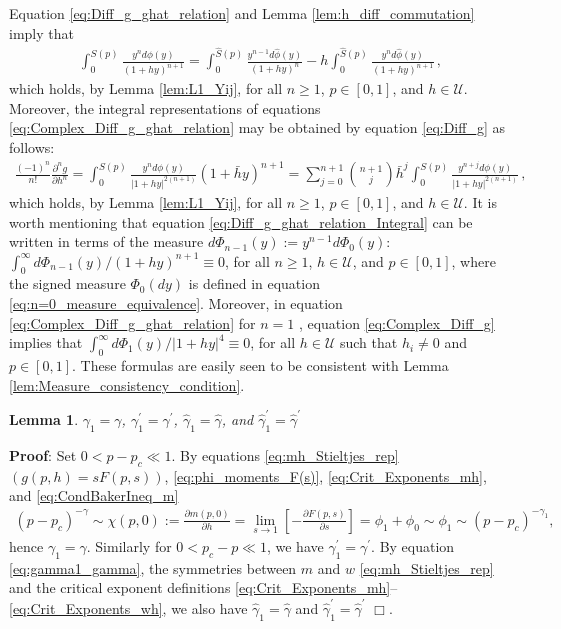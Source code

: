 \documentclass[english,12pt,jmp,graphicx]{revtex4-1}
\newtheorem{lemma}{Lemma}[section]
\newcommand{\ph}{\hat{\phi}}
\newcommand{\gh}{\hat{\gamma}}
\begin{document}
Equation \eqref{eq:Diff_g_ghat_relation} and Lemma
\ref{lem:h_diff_commutation} imply that    
%
\begin{align}\label{eq:Diff_g_ghat_relation_Integral}
  \int_0^{S(p)}\frac{y^nd\phi(y)}{(1+hy)^{n+1}}=\int_0^{\hat{S}(p)}\frac{y^{n-1}d\ph(y)}{(1+hy)^n} 
                                -h \int_0^{\hat{S}(p)}\frac{y^nd\ph(y)}{(1+hy)^{n+1}}
  \,,                              
\end{align}
%
which holds, by Lemma \ref{lem:L1_Yij}, for all $n\geq1$, $p\in[0,1]$, and
$h\in\mathcal{U}$. Moreover, the integral representations of equations
\eqref{eq:Complex_Diff_g_ghat_relation} may be obtained by equation
\eqref{eq:Diff_g} as follows:  
%
\begin{align}\label{eq:Complex_Diff_g}
  \frac{(-1)^n}{n!}\frac{\partial^ng}{\partial h^n}
   =\int_0^{S(p)}\frac{y^nd\phi(y)}{|1+hy|^{2(n+1)}}(1+\bar{h}y)^{n+1}
   =\sum_{j=0}^{n+1}{n+1 \choose j}\bar{h}^j
                 \int_0^{S(p)}\frac{y^{n+j}d\phi(y)}{|1+hy|^{2(n+1)}}\,,
\end{align}
%
which holds, by Lemma \ref{lem:L1_Yij}, for all $n\geq1$, $p\in[0,1]$, and
$h\in\mathcal{U}$. It is worth mentioning that equation
\eqref{eq:Diff_g_ghat_relation_Integral} can be written in terms of
the measure $d\Phi_{n-1}(y):=y^{n-1}d\Phi_0(y)$:
$\int_0^\infty d\Phi_{n-1}(y)/(1+hy)^{n+1}\equiv0$, for all $n\geq1$, $h\in\mathcal{U}$, and
$p\in[0,1]$, where the signed measure $\Phi_0(dy)$ is defined in equation 
\eqref{eq:n=0_measure_equivalence}. Moreover, in equation
\eqref{eq:Complex_Diff_g_ghat_relation} for $n=1$ , equation
\eqref{eq:Complex_Diff_g} implies that $\int_0^\infty d\Phi_1(y)/|1+hy|^4\equiv0$, for 
all $h\in\mathcal{U}$ such that $h_i\neq0$ and $p\in[0,1]$. These formulas
are easily seen to be consistent with Lemma
\ref{lem:Measure_consistency_condition}. 
%
\begin{lemma}\label{lem:nonzero_gamma1_etc}
  $\gamma_1=\gamma$, $\gamma_1^\prime=\gamma^\prime$, $\gh_1=\gh$, and $\gh_1^\prime=\gh^\prime$
\end{lemma}
%
\noindent \textbf{Proof}:
%
Set $0<p-p_c\ll1$. By equations \eqref{eq:mh_Stieltjes_rep}
$(g(p,h)=sF(p,s))$, \eqref{eq:phi_moments_F(s)},
\eqref{eq:Crit_Exponents_mh}, and \eqref{eq:CondBakerIneq_m} 
%
\begin{align}\label{eq:gamma1_gamma}
  (p-p_c)^{-\gamma}\sim\chi(p,0)
          :=\frac{\partial m(p,0)}{\partial h}
          =\lim_{s\to1}\left[-\frac{\partial F(p,s)}{\partial s}\right]
          =\phi_1+\phi_0
          \sim\phi_1\sim(p-p_c)^{-\gamma_1},
\end{align}
%
hence $\gamma_1=\gamma$. Similarly for $0<p_c-p\ll1$, we have $\gamma_1^\prime=\gamma^\prime$. By
equation \eqref{eq:gamma1_gamma}, the symmetries between $m$ and
$w$ \eqref{eq:mh_Stieltjes_rep} and the critical exponent definitions 
\eqref{eq:Crit_Exponents_mh}--\eqref{eq:Crit_Exponents_wh}, we also
have $\gh_1=\gh$ and $\gh_1^\prime=\gh^\prime$ $\Box$.   
\end{document}
